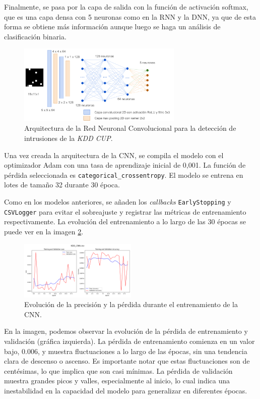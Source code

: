 Finalmente, se pasa por la capa de salida con la función de activación softmax, que es una capa densa con 5 neuronas como en la RNN y la DNN, ya que de esta forma se obtiene más información aunque luego se haga un análisis de clasificación binaria.

\begin{figure}[h]
    \centering
    \includegraphics[width=0.7\textwidth]{img/kddCNN.png}
    \caption{Arquitectura de la Red Neuronal Convolucional para la detección de intrusiones de la \textit{KDD CUP}.}
    \label{fig:kdd_cnn_architecture}
\end{figure}


Una vez creada la arquitectura de la CNN, se compila el modelo con el optimizador Adam con una tasa de aprendizaje inicial de 0,001. La función de pérdida seleccionada es \lstinline|categorical_crossentropy|. El modelo se entrena en lotes de tamaño 32 durante 30 época. 

Como en los modelos anteriores, se añaden los \textit{callbacks} \lstinline|EarlyStopping| y \lstinline|CSVLogger| para evitar el sobreajuste y registrar las métricas de entrenamiento respectivamente. La evolución del entrenamiento a lo largo de las 30 épocas se puede ver en la imagen \ref{fig:cnn_training_process}.

\begin{figure}[h]
    \centering
    \includegraphics[width=0.5\textwidth]{img/KDD_CNN.csv.png}
    \caption{Evolución de la precisión y la pérdida durante el entrenamiento de la CNN.}
    \label{fig:cnn_training_process}
\end{figure}


En la imagen, podemos observar la evolución de la pérdida de entrenamiento y validación (gráfica izquierda). La pérdida de entrenamiento comienza en un valor bajo, 0.006, y muestra fluctuaciones a lo largo de las épocas, sin una tendencia clara de descenso o ascenso. Es importante notar que estas fluctuaciones son de centésimas, lo que implica que son casi mínimas. La pérdida de validación muestra grandes picos y valles, especialmente al inicio, lo cual indica una inestabilidad en la capacidad del modelo para generalizar en diferentes épocas.

